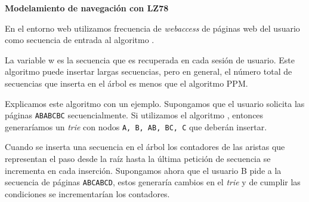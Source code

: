 \textbf{Modelamiento de navegación con LZ78}

En el entorno web utilizamos frecuencia de \emph{webaccess} de páginas web del usuario como secuencia de entrada al algoritmo \lzSieteOcho. 

La variable w es la secuencia que es recuperada en cada sesión de usuario. Este algoritmo puede insertar largas secuencias, pero en general, el número total de secuencias que inserta en el árbol es menos que el algoritmo PPM. 

Explicamos este algoritmo con un ejemplo. Supongamos que el usuario solicita las páginas \texttt{ABABCBC} secuencialmente. Si utilizamos el algoritmo \lzSieteOcho, entonces generaríamos un \emph{trie} con nodos  \texttt{A, B, AB, BC, C} que deberán insertar. 


Cuando se inserta una secuencia en el árbol los contadores de las aristas que representan el paso desde la raíz hasta la última petición de secuencia se incrementa en cada inserción. Supongamos ahora que el usuario B pide a la secuencia de páginas \texttt{ABCABCD}, estos generaría cambios en el \emph{trie} y de cumplir las condiciones se incrementarían los contadores. 
